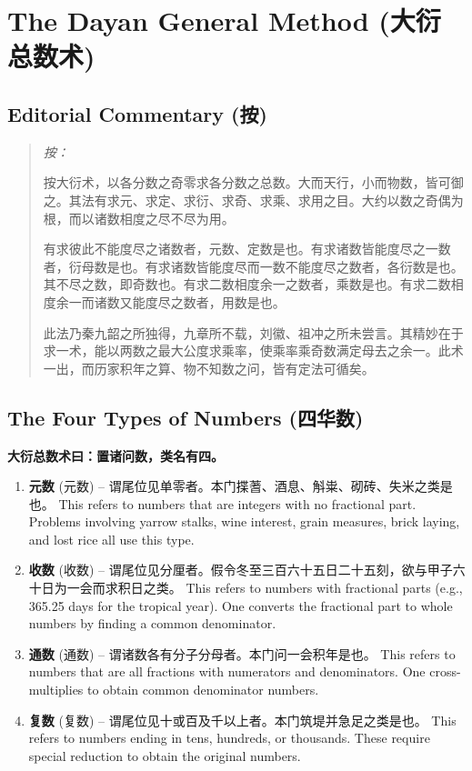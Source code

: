 \documentclass[11pt,a4paper]{article}
\newenvironment{editorial}{%
  \small\begin{quote}\color{prefacecolor}\textit{按：}%
}{\end{quote}\normalsize}
\newcommand{\zhtext}[1]{{\chinese #1}}
\begin{document}
\newpage

\section{The Dayan General Method (\zhtext{大衍总数术})}

\subsection{Editorial Commentary (\zhtext{按})}

\begin{editorial}
按大衍术，以各分数之奇零求各分数之总数。大而天行，小而物数，皆可御之。其法有求元、求定、求衍、求奇、求乘、求用之目。大约以数之奇偶为根，而以诸数相度之尽不尽为用。

有求彼此不能度尽之诸数者，元数、定数是也。有求诸数皆能度尽之一数者，衍母数是也。有求诸数皆能度尽而一数不能度尽之数者，各衍数是也。其不尽之数，即奇数也。有求二数相度余一之数者，乘数是也。有求二数相度余一而诸数又能度尽之数者，用数是也。

此法乃秦九韶之所独得，九章所不载，刘徽、祖冲之所未尝言。其精妙在于求一术，能以两数之最大公度求乘率，使乘率乘奇数满定母去之余一。此术一出，而历家积年之算、物不知数之问，皆有定法可循矣。
\end{editorial}

\subsection{The Four Types of Numbers (\zhtext{四华数})}

\textbf{\zhtext{大衍总数术曰：}置诸问数，类名有四。}

\begin{enumerate}[label=\arabic*.]
  \item \textbf{元数} (\zhtext{元数}) -- \zhtext{谓尾位见单零者。本门揲蓍、酒息、斛粜、砌砖、失米之类是也。} This refers to numbers that are integers with no fractional part. Problems involving yarrow stalks, wine interest, grain measures, brick laying, and lost rice all use this type.
  \item \textbf{收数} (\zhtext{收数}) -- \zhtext{谓尾位见分厘者。假令冬至三百六十五日二十五刻，欲与甲子六十日为一会而求积日之类。} This refers to numbers with fractional parts (e.g., 365.25 days for the tropical year). One converts the fractional part to whole numbers by finding a common denominator.
  \item \textbf{通数} (\zhtext{通数}) -- \zhtext{谓诸数各有分子分母者。本门问一会积年是也。} This refers to numbers that are all fractions with numerators and denominators. One cross-multiplies to obtain common denominator numbers.
  \item \textbf{复数} (\zhtext{复数}) -- \zhtext{谓尾位见十或百及千以上者。本门筑堤并急足之类是也。} This refers to numbers ending in tens, hundreds, or thousands. These require special reduction to obtain the original numbers.
\end{enumerate}
\end{document}
